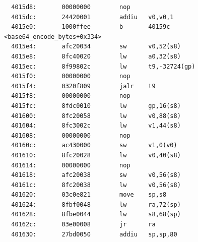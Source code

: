 \documentclass[11pt]{article}
\begin{document}
\begin{verbatim}
  4015d8:       00000000        nop
  4015dc:       24420001        addiu   v0,v0,1
  4015e0:       1000ffee        b       40159c <base64_encode_bytes+0x334>
  4015e4:       afc20034        sw      v0,52(s8)
  4015e8:       8fc40020        lw      a0,32(s8)
  4015ec:       8f99802c        lw      t9,-32724(gp)
  4015f0:       00000000        nop
  4015f4:       0320f809        jalr    t9
  4015f8:       00000000        nop
  4015fc:       8fdc0010        lw      gp,16(s8)
  401600:       8fc20058        lw      v0,88(s8)
  401604:       8fc3002c        lw      v1,44(s8)
  401608:       00000000        nop
  40160c:       ac430000        sw      v1,0(v0)
  401610:       8fc20028        lw      v0,40(s8)
  401614:       00000000        nop
  401618:       afc20038        sw      v0,56(s8)
  40161c:       8fc20038        lw      v0,56(s8)
  401620:       03c0e821        move    sp,s8
  401624:       8fbf0048        lw      ra,72(sp)
  401628:       8fbe0044        lw      s8,68(sp)
  40162c:       03e00008        jr      ra
  401630:       27bd0050        addiu   sp,sp,80


\end{verbatim}
\end{document}

